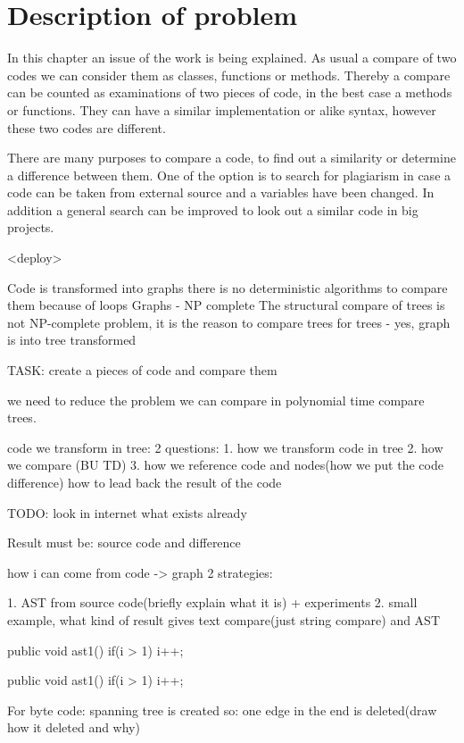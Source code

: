 \chapter{Description of problem}
\label{cha:Description}

In this chapter an issue of the work is being explained. As usual a compare of two codes we can consider them as classes, functions or methods. Thereby a compare can be counted as examinations of two pieces of code, in the best case a methods or functions. They can have a similar implementation or alike syntax, however these two codes are different.

There are many purposes to compare a code, to find out a similarity or determine a difference between them. One of the option is to search for plagiarism in case a code can be taken from external source and a variables have been changed. In addition a general search can be improved to look out a similar code in big projects.

<deploy>

Code is transformed into graphs
there is no deterministic algorithms to compare them because of loops
Graphs - NP complete
The structural compare of trees is not NP-complete problem, it is the reason to compare trees
for trees - yes, graph is into tree transformed

TASK: create a pieces of code and compare them

we need to reduce the problem
we can compare in polynomial time compare trees.

code we transform in tree:
2 questions:
 1. how we transform code in tree
 2. how we compare (BU TD)
 3. how we reference code and nodes(how we put the code difference) 
  	how to lead back the result of the code

TODO: look in internet what exists already 
 
Result must be: source code and difference
 
how i can come from code -> graph
2 strategies:

1. AST from source code(briefly explain what it is)	+ experiments
2. 
small example, what kind of result gives text compare(just string compare) and AST

 public void ast1(){
		if(i > 1) i++;
	}
	
	public void ast1(){
		if(i > 1) 
		i++;
	}
	
For byte code:
spanning tree is created so: one edge in the end is deleted(draw how it deleted and why)

